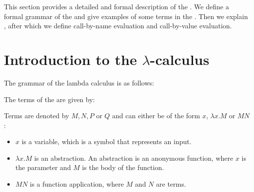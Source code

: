 


This section provides a detailed and formal description of the \lc. We define a formal grammar of the \lc and give examples of some terms in the \lc.
Then we explain \br, after which we define call-by-name evaluation and call-by-value evaluation.


\section{\texorpdfstring{Introduction to the \boldmath$\lambda$-calculus}{Introduction to the Lambda Calculus}}
The grammar of the lambda calculus is as follows:

\begin{definition}[\lc]
	\label{def:lambda-calculus}
	The terms of the \lc are given by: \\
	\begin{grammar}{
		}
	\end{grammar}
\end{definition}

\vspace{10pt}
Terms are denoted by $M, N, P$ or $Q$ and can either be of the form $x$, $\lambda x.M$ or $M N$:
\begin{itemize}[noitemsep]
	\item $x$ is a variable, which is a symbol that represents an input.
	\item $\lambda x.M$ is an abstraction. An abstraction is an anonymous function, where $x$ is the parameter and $M$ is the body of the function.
	\item $M N$ is a function application, where $M$ and $N$ are terms.
\end{itemize}

